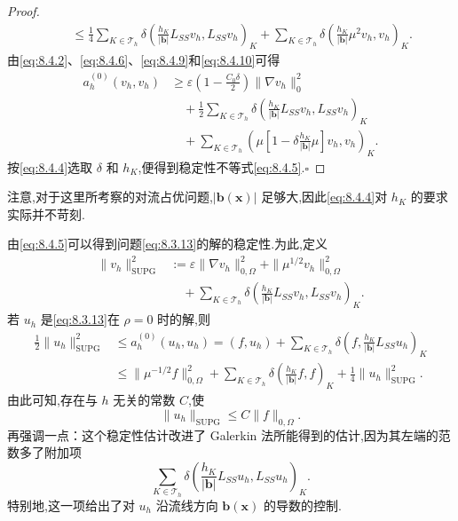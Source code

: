 \begin{proof}
\begin{equation}
\begin{aligned}
    &\quad\le\frac14\sum_{K\in\mathcal T_h}\delta
         \left(\frac{h_K}{|\boldsymbol{b}|}L_{SS}v_h,L_{SS}v_h\right)_K
         +\sum_{K\in\mathcal T_h}\delta
           \left(\frac{h_K}{|\boldsymbol{b}|}\mu^2v_h,v_h\right)_K.
  \end{aligned}
\end{equation}
由\eqref{eq:8.4.2}、\eqref{eq:8.4.6}、\eqref{eq:8.4.9}和\eqref{eq:8.4.10}可得
\begin{equation}\label{eq:8.4.11}
  \begin{aligned}
    a_h^{(0)}(v_h,v_h)
      &\ge\varepsilon\left(1-\frac{C_0\delta}{2}\right)\|\nabla v_h\|_0^2\\
      &\quad+\frac12\sum_{K\in\mathcal T_h}\delta
           \left(\frac{h_K}{|\boldsymbol{b}|}L_{SS}v_h,L_{SS}v_h\right)_K\\
      &\quad+\sum_{K\in\mathcal T_h}
           \left(\mu\left[1-\delta\frac{h_K}{|\boldsymbol{b}|}\mu\right]v_h,v_h\right)_K.
  \end{aligned}
\end{equation}
按\eqref{eq:8.4.4}选取 \(\delta\) 和 \(h_K\),便得到稳定性不等式\eqref{eq:8.4.5}.\hfill\(\square\)
\end{proof}

注意,对于这里所考察的对流占优问题,\(|\boldsymbol{b}(\boldsymbol{x})|\) 足够大,因此\eqref{eq:8.4.4}对 \(h_K\) 的要求实际并不苛刻.

由\eqref{eq:8.4.5}可以得到问题\eqref{eq:8.3.13}的解的稳定性.为此,定义
\begin{equation}\label{eq:8.4.12}
  \begin{aligned}
    \|v_h\|_{\mathrm{SUPG}}^2
      &:=\varepsilon\|\nabla v_h\|_{0,\Omega}^2+\|\mu^{1/2}v_h\|_{0,\Omega}^2\\
      &\quad+\sum_{K\in\mathcal T_h}\delta
             \left(\frac{h_K}{|\boldsymbol{b}|}L_{SS}v_h,L_{SS}v_h\right)_K .
  \end{aligned}
\end{equation}
若 \(u_h\) 是\eqref{eq:8.3.13}在 \(\rho=0\) 时的解,则
\[
  \begin{aligned}
    \frac12\|u_h\|_{\mathrm{SUPG}}^2
      &\le a_h^{(0)}(u_h,u_h)
       =(f,u_h)+\sum_{K\in\mathcal T_h}\delta
               \left(f,\frac{h_K}{|\boldsymbol{b}|}L_{SS}u_h\right)_K\\
      &\le\|\mu^{-1/2}f\|_{0,\Omega}^2+\sum_{K\in\mathcal T_h}\delta
              \left(\frac{h_K}{|\boldsymbol{b}|}f,f\right)_K
             +\frac14\|u_h\|_{\mathrm{SUPG}}^2.
  \end{aligned}
\]
由此可知,存在与 \(h\) 无关的常数 \(C\),使
\begin{equation}\label{eq:8.4.13}
  \|u_h\|_{\mathrm{SUPG}}\le C\|f\|_{0,\Omega}.
\end{equation}
再强调一点：这个稳定性估计改进了 Galerkin 法所能得到的估计,因为其左端的范数多了附加项
\[
  \sum_{K\in\mathcal T_h}\delta
     \left(\frac{h_K}{|\boldsymbol{b}|}L_{SS}u_h,L_{SS}u_h\right)_K.
\]
特别地,这一项给出了对 \(u_h\) 沿流线方向 \(\boldsymbol{b}(\boldsymbol{x})\) 的导数的控制.

